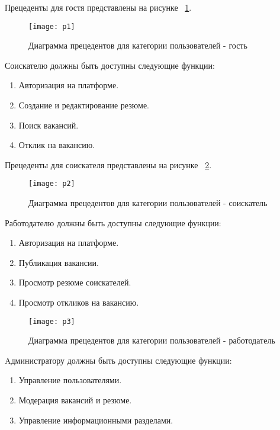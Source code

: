 Прецеденты для гостя представлены на рисунке ~\ref{p1:image}.

\begin{figure}[H]
	\centering
	\texttt{[image: p1]}
	\caption{Диаграмма прецедентов для категории пользователей - гость}
	\label{p1:image}
\end{figure}

Соискателю должны быть доступны следующие функции:

\begin{enumerate}
	\item Авторизация на платформе.
	\item Создание и редактирование резюме.
	\item Поиск вакансий.
	\item Отклик на вакансию.
\end{enumerate}

Прецеденты для соискателя представлены на рисунке ~\ref{p2:image}.

\begin{figure}[H]
	\centering
	\texttt{[image: p2]}
	\caption{Диаграмма прецедентов для категории пользователей - соискатель}
	\label{p2:image}
\end{figure}

Работодателю должны быть доступны следующие функции:

\begin{enumerate}
	\item Авторизация на платформе.
	\item Публикация вакансии.
	\item Просмотр резюме соискателей.
	\item Просмотр откликов на вакансию.
\end{enumerate}

\begin{figure}[H]
	\centering
	\texttt{[image: p3]}
	\caption{Диаграмма прецедентов для категории пользователей - работодатель}
	\label{p3:image}
\end{figure}

Aдминистратору должны быть доступны следующие функции:

\begin{enumerate}
	\item Управление пользователями.
	\item Модерация вакансий и резюме.
	\item Управление информационными разделами.
\end{enumerate}

